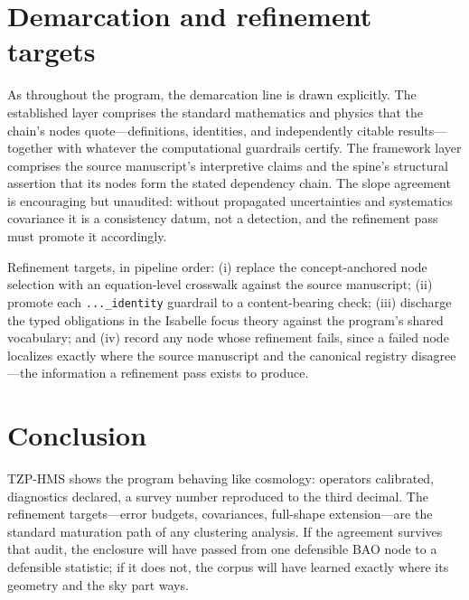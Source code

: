 \documentclass[11pt]{article}
\theoremstyle{remark}
\begin{document}
\section{Demarcation and refinement targets}
\label{sec:demarc}

As throughout the program, the demarcation line is drawn explicitly. The established layer comprises the standard mathematics and physics that the chain's nodes quote---definitions, identities, and independently citable results---together with whatever the computational guardrails certify. The framework layer comprises the source manuscript's interpretive claims and the spine's structural assertion that its nodes form the stated dependency chain. The slope agreement is encouraging but unaudited: without propagated uncertainties and systematics covariance it is a consistency datum, not a detection, and the refinement pass must promote it accordingly.

Refinement targets, in pipeline order: (i) replace the concept-anchored node selection with an equation-level crosswalk against the source manuscript; (ii) promote each \texttt{...\_identity} guardrail to a content-bearing check; (iii) discharge the typed obligations in the Isabelle focus theory against the program's shared vocabulary; and (iv) record any node whose refinement fails, since a failed node localizes exactly where the source manuscript and the canonical registry disagree---the information a refinement pass exists to produce.

\section{Conclusion}
\label{sec:conc}

TZP-HMS shows the program behaving like cosmology: operators calibrated, diagnostics declared, a survey number reproduced to the third decimal. The refinement targets---error budgets, covariances, full-shape extension---are the standard maturation path of any clustering analysis. If the agreement survives that audit, the enclosure will have passed from one defensible BAO node to a defensible statistic; if it does not, the corpus will have learned exactly where its geometry and the sky part ways.
\end{document}
